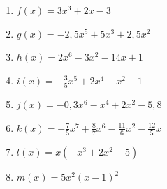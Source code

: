 \begin{Exercise}[title={Gib das Verhalten für \(x\to \pm \infty \) an}, label=ganzVerA1]

	\begin{minipage}{\textwidth}
		\begin{minipage}{0.5\textwidth}
			\begin{enumerate}[label=\alph*)]
				\item \(f(x)=3x^3+2x-3\)
				\item \(g(x)=-2,5x^5+5x^3+2,5x^2\)
				\item \(h(x)=2x^6-3x^2-14x+1\)
				\item \(i(x)=-\frac{3}{5}x^5+2x^4+x^2-1\)
			\end{enumerate}
		\end{minipage}%
		\begin{minipage}{0.5\textwidth}
			\begin{enumerate}[label=\alph*)]
				\setcounter{enumi}{4}
				\item \(j(x)=-0,3x^6-x^4+2x^2-5,8\)
				\item \(k(x)=-\frac{7}{5}x^7+\frac{8}{7}x^6-\frac{11}{6}x^2-\frac{12}{5}x\)
				\item \(l(x)=x\left(-x^3+2x^2+5\right)\)
				\item \(m(x)=5x^2\left(x-1\right)^2\)
			\end{enumerate}
		\end{minipage}%
	\end{minipage}
\end{Exercise}

